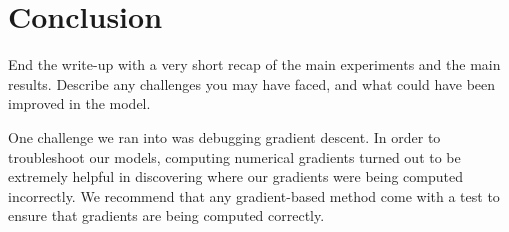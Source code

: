 \documentclass[11pt]{article}
\begin{document}
\section{Conclusion}

End the write-up with a very short recap of the main experiments and the main results. Describe any challenges you may have faced, and what could have been improved in the model.

One challenge we ran into was debugging gradient descent. In order to troubleshoot our models, computing numerical gradients turned out to be extremely helpful in discovering where our gradients were being computed incorrectly. We recommend that any gradient-based method come with a test to ensure that gradients are being computed correctly.



\end{document}
